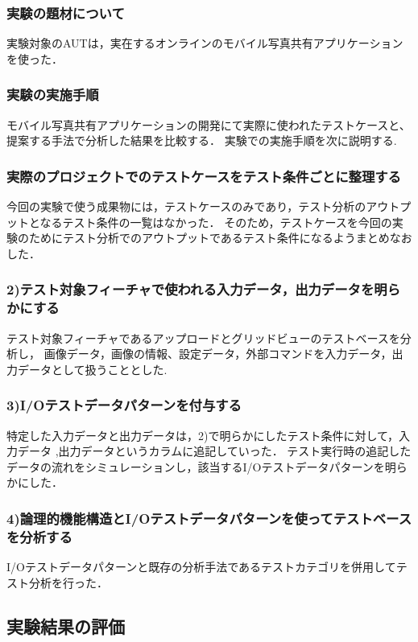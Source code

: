 \documentclass[a4paper,10pt]{jreport}
\begin{document}
\subsubsection{実験の題材について}

実験対象のAUTは，実在するオンラインのモバイル写真共有アプリケーションを使った．

\subsubsection{実験の実施手順}
モバイル写真共有アプリケーションの開発にて実際に使われたテストケースと、提案する手法で分析した結果を比較する．
実験での実施手順を次に説明する.
\subsubsection{実際のプロジェクトでのテストケースをテスト条件ごとに整理する}
今回の実験で使う成果物には，テストケースのみであり，テスト分析のアウトプットとなるテスト条件の一覧はなかった．
そのため，テストケースを今回の実験のためにテスト分析でのアウトプットであるテスト条件になるようまとめなおした．

\subsubsection{2)テスト対象フィーチャで使われる入力データ，出力データを明らかにする}
テスト対象フィーチャであるアップロードとグリッドビューのテストベースを分析し，
画像データ，画像の情報、設定データ，外部コマンドを入力データ，出力データとして扱うこととした.

\subsubsection{3)I/Oテストデータパターンを付与する}
特定した入力データと出力データは，2)で明らかにしたテスト条件に対して，入力データ ,出力データというカラムに追記していった．
テスト実行時の追記したデータの流れをシミュレーションし，該当するI/Oテストデータパターンを明らかにした．

\subsubsection{4)論理的機能構造とI/Oテストデータパターンを使ってテストベースを分析する}
I/Oテストデータパターンと既存の分析手法であるテストカテゴリを併用してテスト分析を行った．

\subsection{実験結果の評価}
\end{document}

